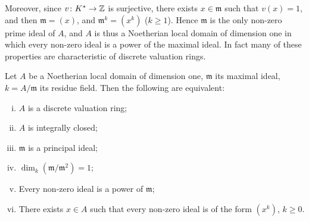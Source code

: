 Moreover, since $v \colon K^* \to \mathbb{Z}$ is surjective, there exists $x \in \mathfrak{m}$ such that $v(x) = 1$, and then $\mathfrak{m} = (x)$, and $\mathfrak{m}^k = (x^k)$ ($k \geq 1$). Hence $\mathfrak{m}$ is the only non-zero prime ideal of $A$, and $A$ is thus a Noetherian local domain of dimension one in which every non-zero ideal is a power of the maximal ideal. In fact many of these properties are characteristic of discrete valuation rings.

\begin{proposition}\label{prop:dvr-equivalent}
Let $A$ be a Noetherian local domain of dimension one, $\mathfrak{m}$ its maximal ideal, $k = A/\mathfrak{m}$ its residue field. Then the following are equivalent:
\begin{enumerate}[i)]
    \item $A$ is a discrete valuation ring;
    \item $A$ is integrally closed;
    \item $\mathfrak{m}$ is a principal ideal;
    \item $\dim_k(\mathfrak{m}/\mathfrak{m}^2) = 1$;
    \item Every non-zero ideal is a power of $\mathfrak{m}$;
    \item There exists $x \in A$ such that every non-zero ideal is of the form $(x^k)$, $k \geq 0$.
\end{enumerate}
\end{proposition}

